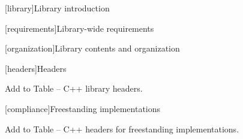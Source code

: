 
[library]{Library introduction}

\setcounter{section}{4}

[requirements]{Library-wide requirements}

[organization]{Library contents and organization}

\setcounter{subsubsection}{1}

[headers]{Headers}

\pnum
Add  to Table  -- C++ library headers.

[compliance]{Freestanding implementations}

Add  to Table  -- C++ headers for freestanding implementations.
